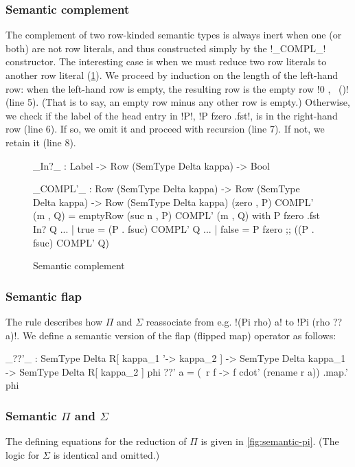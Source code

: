 \documentclass[sigplan,10pt,anonymous,review]{acmart}\settopmatter{printfolios=true,printccs=false,printacmref=false}
\begin{document}
\subsubsection{Semantic complement} The complement of two row-kinded semantic types is always inert when one (or both) are not row literals, and thus constructed simply by the !_COMPL_! constructor. The interesting case is when we must reduce two row literals to another row literal (\cref{fig:semantic-complement}). We proceed by induction on the length of the left-hand row: when the left-hand row is empty, the resulting row is the empty row !0 , \ ()! (line 5). (That is to say, an empty row minus any other row is empty.) Otherwise, we check if the label of the head entry in !P!, !P fzero .fst!, is in the right-hand row (line 6). If so, we omit it and proceed with recursion (line 7). If not, we retain it (line 8).

\begin{figure}
\begin{agda}
_In?_ : Label -> Row (SemType Delta kappa) -> Bool

_COMPL'_ : Row (SemType Delta kappa) -> Row (SemType Delta kappa) -> 
           Row (SemType Delta kappa)
(zero , P) COMPL' (m , Q) = emptyRow
(suc n , P) COMPL' (m , Q) with P fzero .fst In? Q 
... | true = (P . fsuc) COMPL' Q
... | false = P fzero ;; ((P . fsuc) COMPL' Q) 
\end{agda}
\caption{Semantic complement}
\label{fig:semantic-complement}
\end{figure}

\subsubsection{Semantic flap}
The rule  describes how $\Pi$ and $\Sigma$ reassociate from e.g. !(Pi rho) a! to !Pi (rho ?? a)!. We define a semantic version of the flap (flipped map) operator as follows:

\begin{agda}
_??'_ : SemType Delta R[ kappa_1 '-> kappa_2 ] -> 
       SemType Delta kappa_1 -> SemType Delta R[ kappa_2 ]
phi ??' a = (\ r f -> f cdot' (rename r a)) .map.' phi
\end{agda}

\subsubsection{Semantic $\Pi$ and $\Sigma$} The defining equations for the reduction of $\Pi$ is given in \cref{fig:semantic-pi}. (The logic for $\Sigma$ is identical and omitted.)
\end{document}
